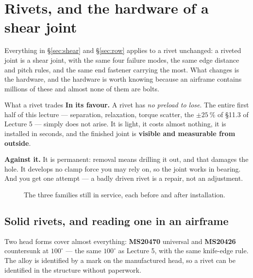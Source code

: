 \documentclass[11pt,a4paper]{article}
\begin{document}
\section{Rivets, and the hardware of a shear joint}
\label{sec:rivets}

Everything in \S\ref{sec:shear} and \S\ref{sec:row} applies to a rivet unchanged: a riveted joint is
a shear joint, with the same four failure modes, the same edge distance and pitch rules, and the same
end fastener carrying the most. What changes is the hardware, and the hardware is worth knowing
because an airframe contains millions of these and almost none of them are bolts.

\begin{keybox}{What a rivet trades}
\textbf{In its favour.} A rivet has \emph{no preload to lose}. The entire first half of this
lecture --- separation, relaxation, torque scatter, the $\pm\SI{25}{\percent}$ of \S11.3 of
Lecture 5 --- simply does not arise. It is light, it costs almost nothing, it is installed in
seconds, and the finished joint is \textbf{visible and measurable from outside}.

\medskip
\textbf{Against it.} It is permanent: removal means drilling it out, and that damages the hole.
It develops no clamp force you may rely on, so the joint works in bearing. And you get one attempt
--- a badly driven rivet is a repair, not an adjustment.
\end{keybox}

\begin{figure}[H]\centering
\resizebox{\textwidth}{!}{}
\caption{The three families still in service, each before and after installation.}
\label{fig:rivets}
\end{figure}

\subsection{Solid rivets, and reading one in an airframe}

Two head forms cover almost everything: \textbf{MS20470} universal and \textbf{MS20426} countersunk
at $100^\circ$ --- the same $100^\circ$ as Lecture 5, with the same knife-edge rule. The alloy is
identified by a mark on the manufactured head, so a rivet can be identified in the structure without
paperwork.
\end{document}
